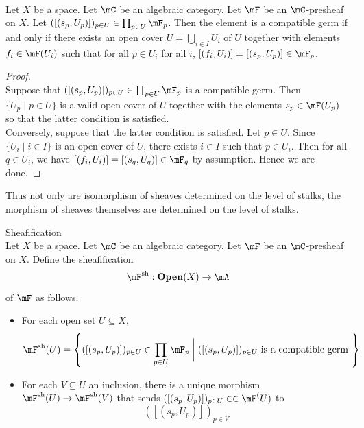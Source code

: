 \documentclass[a4paper]{article}
\begin{document}
\begin{lmm}{}{}\\
Let $X$ be a space. Let $\mC$ be an algebraic category. Let $\mF$ be an $\mC$-presheaf on $X$. Let $([(s_p,U_p)])_{p\in U}\in\prod_{p\in U}\mF_p$. Then the element is a compatible germ if and only if there exists an open cover $U=\bigcup_{i\in I}U_i$ of $U$ together with elements $f_i\in\mF(U_i)$ such that for all $p\in U_i$ for all $i$, $[(f_i,U_i)]=[(s_p,U_p)]\in\mF_p$. 
\begin{proof}\\
Suppose that $([(s_p,U_p)])_{p\in U}\in\prod_{p\in U}\mF_p$ is a compatible germ. Then $\{U_p\;|\;p\in U\}$ is a valid open cover of $U$ together with the elements $s_p\in\mF(U_p)$ so that the latter condition is satisfied. \\

Conversely, suppose that the latter condition is satisfied. Let $p\in U$. Since $\{U_i\;|\;i\in I\}$ is an open cover of $U$, there exists $i\in I$ such that $p\in U_i$. Then for all $q\in U_i$, we have $[(f_i,U_i)]=[(s_q,U_q)]\in\mF_q$ by assumption. Hence we are done. 
\end{proof}
\end{lmm}

Thus not only are isomorphism of sheaves determined on the level of stalks, the morphism of sheaves themselves are determined on the level of stalks. 

\begin{defn}{Sheafification}{}\\
Let $X$ be a space. Let $\mC$ be an algebraic category. Let $\mF$ be an $\mC$-presheaf on $X$. Define the sheafification $$\mF^\text{sh}:\bold{Open}(X)\to\mA$$ of $\mF$ as follows. 
\begin{itemize}
\item For each open set $U\subseteq X$, $$\mF^\text{sh}(U)=\left\{([(s_p,U_p)])_{p\in U}\in\prod_{p\in U}\mF_p\;\bigg{|}\;([(s_p,U_p)])_{p\in U}\text{ is a compatible germ }\right\}$$
\item For each $V\subseteq U$ an inclusion, there is a unique morphism $\mF^\text{sh}(U)\to\mF^\text{sh}(V)$ that sends $([(s_p,U_p)])_{p\in U}\in\in\mF^\text(U)$ to $$([(s_p,U_p)])_{p\in V}$$
\end{itemize}
\end{defn}
\end{document}

